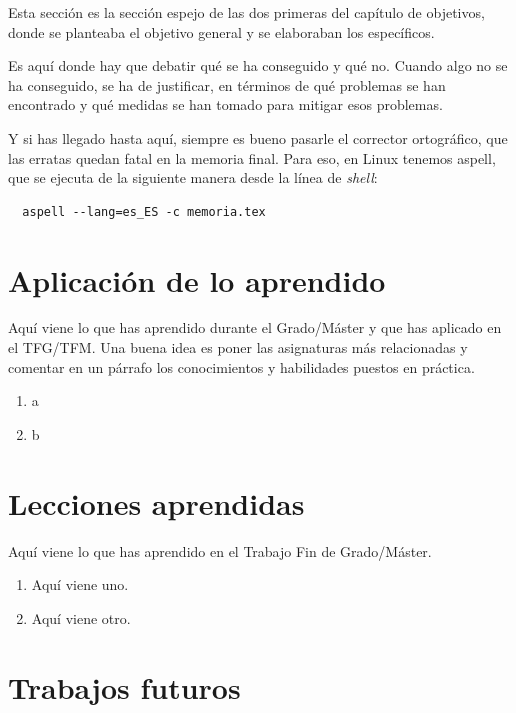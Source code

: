 \documentclass[a4paper, 12pt]{book}
\begin{document}
Esta sección es la sección espejo de las dos primeras del capítulo de objetivos, donde se planteaba el objetivo general y se elaboraban los específicos.

Es aquí donde hay que debatir qué se ha conseguido y qué no. 
Cuando algo no se ha conseguido, se ha de justificar, en términos de qué problemas se han encontrado y qué medidas se han tomado para mitigar esos problemas.

Y si has llegado hasta aquí, siempre es bueno pasarle el corrector ortográfico, que las erratas quedan fatal en la memoria final.
Para eso, en Linux tenemos aspell, que se ejecuta de la siguiente manera desde la línea de \emph{shell}:

\begin{verbatim}
  aspell --lang=es_ES -c memoria.tex
\end{verbatim}

\section{Aplicación de lo aprendido}
\label{sec:aplicacion}

Aquí viene lo que has aprendido durante el Grado/Máster y que has aplicado en el TFG/TFM. Una buena idea es poner las asignaturas más relacionadas y comentar en un párrafo los conocimientos y habilidades puestos en práctica.

\begin{enumerate}
  \item a
  \item b
\end{enumerate}


\section{Lecciones aprendidas}
\label{sec:lecciones_aprendidas}

Aquí viene lo que has aprendido en el Trabajo Fin de Grado/Máster.

\begin{enumerate}
  \item Aquí viene uno.
  \item Aquí viene otro.
\end{enumerate}


\section{Trabajos futuros}
\label{sec:trabajos_futuros}
\end{document}
